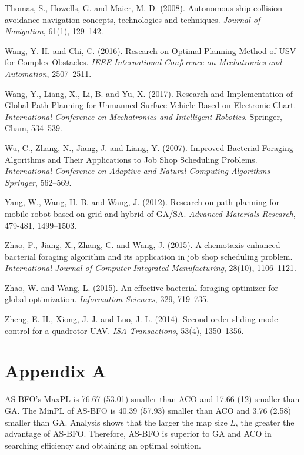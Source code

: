 \documentclass{PDS}%
\theoremstyle{definition}
\begin{document}
\begin{Backmatter}
\begin{thebibliography}{}
{Thomas, S., Howells, G. and Maier, M. D.} ({2008}).
Autonomous ship collision avoidance navigation concepts, technologies and techniques.
\textit{Journal of Navigation}, {61}(1), 129--142.
\pagebreak

{Wang, Y. H. and Chi, C.} ({2016}).
Research on Optimal Planning Method of USV for Complex Obstacles. \textit{IEEE International Conference on Mechatronics and Automation},
2507--2511.

{Wang, Y., Liang, X., Li, B. and Yu, X. } ({2017}).
Research and Implementation of Global Path Planning for Unmanned Surface Vehicle Based on Electronic Chart.
\textit{International Conference on Mechatronics and Intelligent Robotics}. Springer, Cham, 534--539.

{Wu, C., Zhang, N., Jiang, J. and Liang, Y.} ({2007}).
Improved Bacterial Foraging Algorithms and Their Applications to Job Shop Scheduling Problems.
\textit{International Conference on Adaptive and Natural Computing Algorithms Springer}, 562--569.

{Yang, W., Wang, H. B. and Wang, J.} ({2012}). Research on path planning for mobile robot based on grid and hybrid of GA/SA.
\textit{Advanced Materials Research},
479-481, 1499--1503.

{Zhao, F., Jiang, X., Zhang, C. and Wang, J.} (2015).
A chemotaxis-enhanced bacterial foraging algorithm and its application in job shop scheduling problem.
\textit{International Journal of Computer Integrated Manufacturing},
{28}(10), 1106--1121.

{Zhao, W. and Wang, L.} ({2015}).
An effective bacterial foraging optimizer for global optimization.
\textit{Information Sciences}, {329}, 719--735.

{Zheng, E. H., Xiong, J. J. and Luo, J. L.} ({2014}).
Second order sliding mode control for a quadrotor UAV.
\textit{ISA Transactions}, {53}(4), 1350--1356.

\end{thebibliography}


\appendix

\section*{Appendix A}

AS-BFO's MaxPL is 76{.}67 (53{.}01) smaller
than ACO and 17{.}66 (12) smaller than GA. The MinPL of AS-BFO is 40{.}39 (57{.}93) smaller
than ACO and 3{.}76 (2{.}58) smaller than GA. Analysis shows that the larger the map size $L$,
the greater the advantage of AS-BFO. Therefore, AS-BFO is superior to GA and ACO in
searching efficiency and obtaining an optimal solution.

\end{Backmatter}
\end{document}

